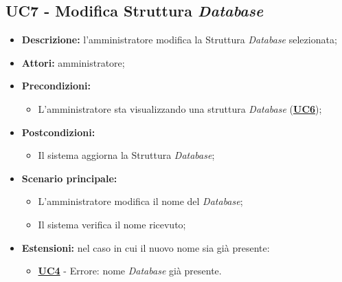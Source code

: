 \subsection{UC7 - Modifica Struttura \textit{Database}}
\label{sec:UC7}
\begin{itemize}
	\item \textbf{Descrizione:} l’amministratore modifica la Struttura \textit{Database} selezionata;
	\item \textbf{Attori:} amministratore;
	\item \textbf{Precondizioni:} 
	\begin{itemize}
		\item L’amministratore sta visualizzando una struttura \textit{Database} (\hyperref[sec:UC6]{\textbf{UC6}});
	\end{itemize}
	\item \textbf{Postcondizioni:} 
	\begin{itemize}
		\item Il sistema aggiorna la Struttura \textit{Database};
	\end{itemize}
	\item \textbf{Scenario principale:} 
	\begin{itemize}
		\item L’amministratore modifica il nome del \textit{Database};
		\item Il sistema verifica il nome ricevuto;
	\end{itemize}
	\item \textbf{Estensioni:} nel caso in cui il nuovo nome sia già presente:
	\begin{itemize}
		\item \hyperref[sec:UC4]{\textbf{UC4}} - Errore: nome \textit{Database} già presente.
	\end{itemize}
\end{itemize}

